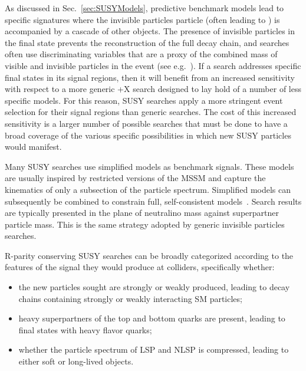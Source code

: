 As discussed in Sec.~\ref{sec:SUSYModels}, predictive benchmark models lead to specific signatures
where the invisible particles particle (often leading to \MET) is accompanied by a cascade of other objects. 
The presence of invisible particles in the final state prevents the reconstruction of the full decay chain, and 
searches often use discriminating variables that are a proxy of the combined mass of visible and invisible
particles in the event (see e.g.~\cite{Lester:1999tx}). 
If a search addresses specific final states in its signal regions,
then it will benefit from an increased sensitivity with respect to a more generic \MET+X search
designed to lay hold of a number of less specific models.  
For this reason, SUSY searches apply a more stringent event selection for their signal regions than generic searches. 
The cost of this increased sensitivity is a larger number of possible searches that must be done to have a
broad coverage of the various specific possibilities in which new SUSY particles would manifest. 

Many SUSY searches use simplified models as benchmark signals. These models are usually inspired by restricted versions of the
MSSM and capture the kinematics of only a subsection of the particle spectrum. Simplified models can subsequently be combined to constrain
full, self-consistent models~\cite{Kraml:2013mwa}. Search results are typically presented in the plane of neutralino mass against superpartner particle mass.
This is the same strategy adopted 
by generic invisible particles searches. 

R-parity conserving SUSY searches can be broadly categorized
according to the features of the signal they would produce at colliders, specifically whether:
\begin{itemize}
\item the new particles sought are strongly or weakly produced, leading to decay chains containing strongly or weakly interacting SM particles; %
\item heavy superpartners of the top and bottom quarks are present, leading to final states with heavy flavor quarks;%
\item whether the particle spectrum of LSP and NLSP is compressed, leading to either soft or long-lived objects. %
\end{itemize}

